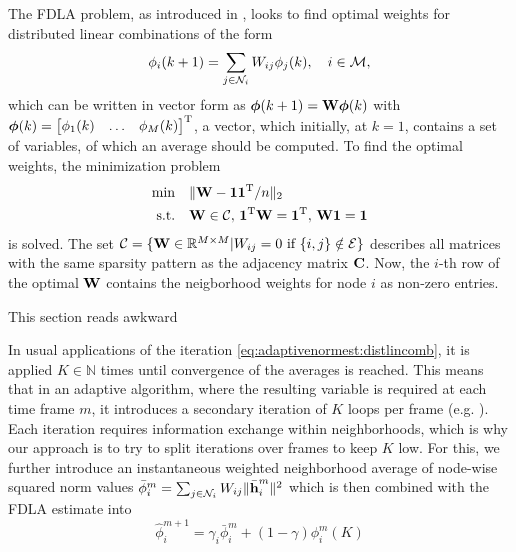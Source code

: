 \documentclass{article}
\begin{document}
The FDLA problem, as introduced in \cite{xiaoFastLinearIterations2004}, looks to find optimal weights for distributed linear combinations of the form
\begin{equation}
    \phi_i({k+1}) = \sum_{j \in \mathcal{N}_i} W_{ij} \phi_j({k}),\quad i\in \mathcal{M},\label{eq:adaptivenormest:distlincomb}
\end{equation}
which can be written in vector form as \(\bm{\phi}({k+1}) = \bm{\mathrm{W}} \bm{\phi}({k})\) with \(\bm{\phi}(k) = \begin{bmatrix} \phi_1(k) & \ldots & \phi_M(k) \end{bmatrix}^{\mathrm{T}}\), a vector, which initially, at \(k=1\), contains a set of variables, of which an average should be computed.
To find the optimal weights, the minimization problem
\begin{equation}
    \begin{aligned}
        \min& \quad \| \bm{\mathrm{W}} - \bm{1}\bm{1}^{\mathrm{T}}/n\|_2\\
        \text{s.t.}& \quad \bm{\mathrm{W}} \in \mathcal{C},\, \bm{1}^{\mathrm{T}} \bm{\mathrm{W}} = \bm{1}^{\mathrm{T}},\, \bm{\mathrm{W}} \bm{1}= \bm{1}
    \end{aligned}\label{eq:adaptivenormest:fdlaminprob}
\end{equation}
is solved.
The set \(\mathcal{C} = \{\bm{\mathrm{W}} \in \mathbb{R}^{M \times M} \vert W_{ij} = 0 \text{ if } \{i,j\} \notin \mathcal{E}\}\) describes all matrices with the same sparsity pattern as the adjacency matrix \(\bm{\mathrm{C}}\).
Now, the \(i\)-th row of the optimal \(\bm{\mathrm{W}}\) contains the neigborhood weights for node \(i\) as non-zero entries.
\begin{todo}
    This section reads awkward
\end{todo}
In usual applications of the iteration \eqref{eq:adaptivenormest:distlincomb}, it is applied \(K \in \mathbb{N}\) times until convergence of the averages is reached.
This means that in an adaptive algorithm, where the resulting variable is required at each time frame \(m\), it introduces a secondary iteration of \(K\) loops per frame (e.g. \cite{yuDistributedBlindSystem2014, liuDistributedBlindIdentification2016}).
Each iteration requires information exchange within neighborhoods, which is why our approach is to try to split iterations over frames to keep \(K\) low.
For this, we further introduce an instantaneous weighted neighborhood average of node-wise squared norm values \(\bar{\phi}_i^{m} = \sum_{j \in \mathcal{N}_i} W_{ij} \|\bar{\bm{\mathrm{h}}}_i^m\|^2\) which is then combined with the FDLA estimate into
\begin{equation}
    \hat{\phi}_i^{m+1} = \gamma_i \bar{\phi}_i^{m} + (1-\gamma) \phi_i^{m}(K)
\end{equation}
\end{document}
